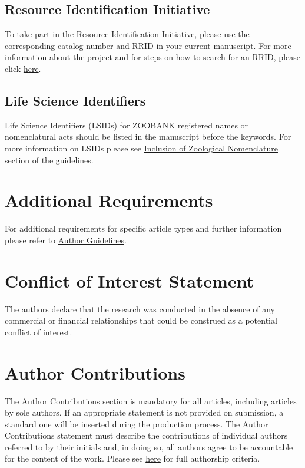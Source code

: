 \documentclass[utf8]{frontiersSCNS} %
\begin{document}
\subsection{Resource Identification Initiative}
To take part in the Resource Identification Initiative, please use the
corresponding catalog number and RRID in your current manuscript. For more
information about the project and for steps on how to search for an RRID,
please click
\href{http://www.frontiersin.org/files/pdf/letter_to_author.pdf}{here}.

\subsection{Life Science Identifiers}
Life Science Identifiers (LSIDs) for ZOOBANK registered names or nomenclatural
acts should be listed in the manuscript before the keywords. For more
information on LSIDs please see
\href{http://www.frontiersin.org/about/AuthorGuidelines#InclusionofZoologicalNomenclature}{Inclusion
of Zoological Nomenclature} section of the guidelines.


\section{Additional Requirements}

For additional requirements for specific article types and further information
please refer to
\href{http://www.frontiersin.org/about/AuthorGuidelines#AdditionalRequirements}{Author
Guidelines}.

\section*{Conflict of Interest Statement}

The authors declare that the research was conducted in the absence of any
commercial or financial relationships that could be construed as a potential
conflict of interest.

\section*{Author Contributions}

The Author Contributions section is mandatory for all articles, including
articles by sole authors. If an appropriate statement is not provided on
submission, a standard one will be inserted during the production process. The
Author Contributions statement must describe the contributions of individual
authors referred to by their initials and, in doing so, all authors agree to be
accountable for the content of the work. Please see
\href{http://home.frontiersin.org/about/author-guidelines#AuthorandContributors}{here}
for full authorship criteria.
\end{document}
